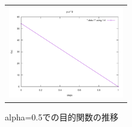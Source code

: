 \begin{figure}[h]
\begin{center}
\begin{tabular}{c}
    \begin{minipage}{0.33\hsize}
    \begin{center}
    \includegraphics[width=5.0cm]{figs/alpha05.pdf}
    \caption{alpha=0.5での目的関数の推移}
    \label{fig:alpha0.5}
    \end{center}
    \end{minipage}
  \end{tabular}
 \end{center}
\end{figure}

